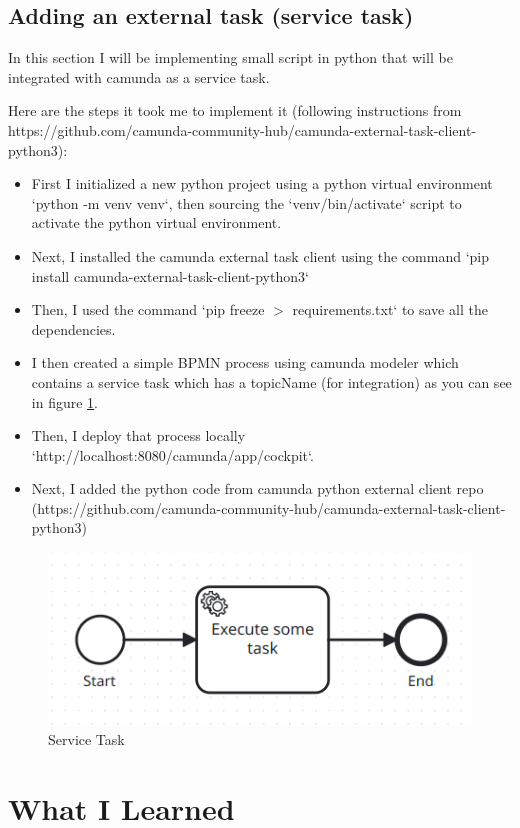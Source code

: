 \documentclass[12pt]{article}
\begin{document}
{  \subsection{Adding an external task (service task)}

In this section I will be implementing small script in python that will be integrated with camunda as a service task.

Here are the steps it took me to implement it (following instructions from https://github.com/camunda-community-hub/camunda-external-task-client-python3):

\begin{itemize}
  \item First I initialized a new python project using a python virtual environment `python -m venv venv`, then sourcing the `venv/bin/activate` script to activate the python virtual environment.
  \item Next, I installed the camunda external task client using the command `pip install camunda-external-task-client-python3`
  \item Then, I used the command `pip freeze $ > $ requirements.txt` to save all the dependencies.
  \item I then created a simple BPMN process using camunda modeler which contains a service task which has a topicName (for integration) as you can see in figure \ref{fig:service_task}.
  \item Then, I deploy that process locally `http://localhost:8080/camunda/app/cockpit`.
  \item Next, I added the python code from camunda python external client repo (https://github.com/camunda-community-hub/camunda-external-task-client-python3)
\end{itemize}

\begin{figure}[h]
    \centering
    \includegraphics[width=.50\linewidth]{service_task.png}
    \caption{Service Task}
    \label{fig:service_task}
\end{figure}

\pagebreak

\section{What I Learned}

}
\end{document}
